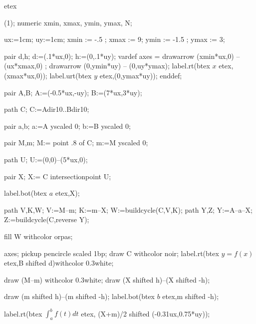 \documentclass[12pt]{article}
\begin{document}
 
etex 



%
%
%
%
%
%
%
%

\beginfig(1);
  numeric xmin, xmax, ymin, ymax, N;

  ux:=1cm;  uy:=1cm;
  xmin := -.5 ; xmax := 9;
  ymin := -1.5 ; ymax := 3;


  pair d,h;
  d:=(.1*ux,0);
  h:=(0,.1*uy);
  vardef axes =
   drawarrow (xmin*ux,0) -- (ux*xmax,0) ; %
   drawarrow (0,ymin*uy) -- (0,uy*ymax); %
   label.rt(btex $x$ etex,(xmax*ux,0)); %
   label.urt(btex $y$ etex,(0,ymax*uy)); %
  enddef;


pair A,B; A:=(-0.5*ux,-uy); B:=(7*ux,3*uy);

path C; C:=A{dir10}..B{dir10};

pair     a,b; a:=A yscaled 0; b:=B yscaled 0;


pair M,m; M:= point .8 of C; m:=M yscaled 0;

path U; U:=(0,0)--(5*ux,0);

pair X; X:= C intersectionpoint U;

label.bot(btex $a$ etex,X);

path V,K,W; V:=M--m; K:=m--X; W:=buildcycle(C,V,K);
path Y,Z; Y:=A--a--X; Z:=buildcycle(C,reverse Y);

fill W withcolor orpas; %

axes;
pickup  pencircle scaled 1bp;
draw C withcolor noir; label.rt(btex $y=f(x)$ etex,B shifted d)withcolor 0.3white;



draw (M--m)  withcolor 0.3white;
draw (X shifted h)--(X shifted -h); 

 draw (m shifted h)--(m shifted -h); label.bot(btex $b$ etex,m shifted -h);

label.rt(btex $\displaystyle\int_a^bf(t)dt$ etex, (X+m)/2 shifted (-0.31ux,0.75*uy));
\end{document}
